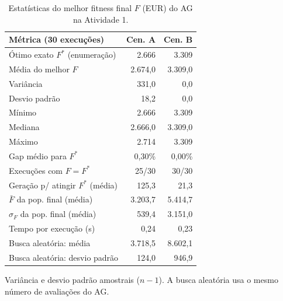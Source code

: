 \begin{table}[!t]
\centering
\footnotesize
\setlength{\tabcolsep}{4pt}
\caption{Estatísticas do melhor fitness final $F$ (EUR) do AG na Atividade 1.}
\label{tab:a1_stats}
\begin{tabular}{@{}lrr@{}}
\toprule
Métrica (30 execuções) & Cen. A & Cen. B \\
\midrule
Ótimo exato $F^*$ (enumeração) & 2.666 & 3.309 \\
\midrule
Média do melhor $F$ & 2.674{,}0 & 3.309{,}0 \\
Variância & 331{,}0 & 0{,}0 \\
Desvio padrão & 18{,}2 & 0{,}0 \\
Mínimo & 2.666 & 3.309 \\
Mediana & 2.666{,}0 & 3.309{,}0 \\
Máximo & 2.714 & 3.309 \\
Gap médio para $F^*$ & 0{,}30\% & 0{,}00\% \\
Execuções com $F=F^*$ & 25/30 & 30/30 \\
Geração p/ atingir $F^*$ (média) & 125{,}3 & 21{,}3 \\
$\bar F$ da pop. final (média) & 3.203{,}7 & 5.414{,}7 \\
$\sigma_F$ da pop. final (média) & 539{,}4 & 3.151{,}0 \\
Tempo por execução (s) & 0{,}24 & 0{,}23 \\
\midrule
Busca aleatória: média & 3.718{,}5 & 8.602{,}1 \\
Busca aleatória: desvio padrão & 124{,}0 & 946{,}9 \\
\bottomrule
\end{tabular}
\par\smallskip\parbox{0.95\linewidth}{\scriptsize Variância e desvio padrão amostrais ($n-1$). A busca aleatória usa o mesmo número de avaliações do AG.}
\end{table}
